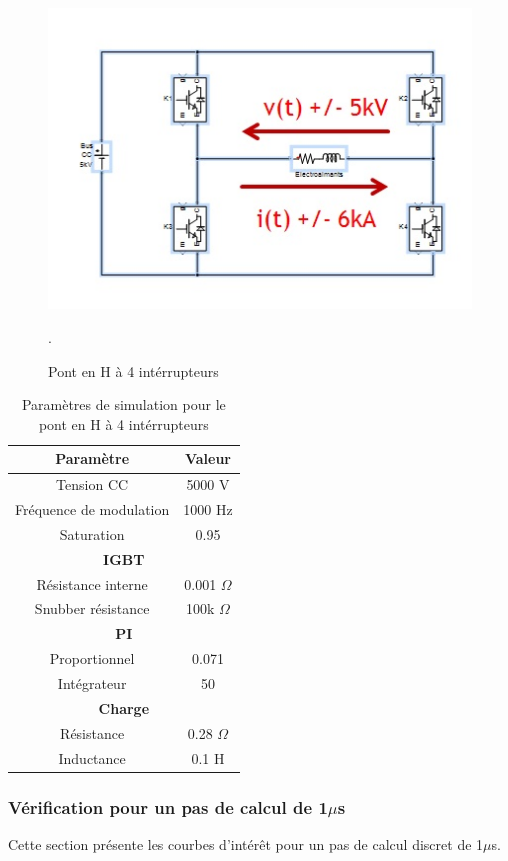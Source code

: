 \documentclass[11pt,letterpaper,final]{report}
\begin{document}
\begin{figure}[htb]
\centering
\includegraphics[scale=1]{Fig/Hacheur4Quadrants/Hacheur.jpg}
\caption{Pont en H à 4 intérrupteurs}.
\label{hach}
\end{figure}

\begin{table}[htb]
\centering
\begin{tabular}{|c|c|} 
  \hline
  Paramètre & Valeur  \\
  \hline\hline
  Tension CC & 5000 V\\ \hline
  Fréquence de modulation & 1000 Hz\\ \hline
  Saturation & 0.95 \\ \hline \hline
  \multicolumn{2}{|c|}{\textbf{IGBT}}\\ \hline
  Résistance interne & 0.001 $\Omega$\\
  Snubber résistance & 100k $\Omega$\\ \hline \hline
   \multicolumn{2}{|c|}{\textbf{PI}}\\ \hline
  Proportionnel & 0.071 \\
  Intégrateur & 50 \\ \hline \hline
  \multicolumn{2}{|c|}{\textbf{Charge}}\\ \hline
  Résistance & 0.28 $\Omega$\\
  Inductance & 0.1 H\\
  \hline
\end{tabular}
\caption{Paramètres de simulation pour le pont en H à 4 intérrupteurs}
\label{p_hash}
\end{table}

\subsubsection{Vérification pour un pas de calcul de 1$\mu$s}
Cette section présente les courbes d'intérêt pour un pas de calcul discret de 1$\mu$s. 
\end{document}
